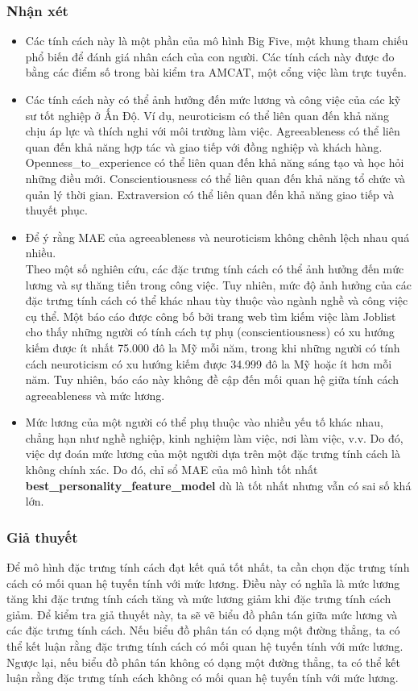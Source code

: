 \documentclass[]{article}
\begin{document}
\subsubsection{Nhận xét}
\begin{itemize}
  \item Các tính cách này là một phần của mô hình Big Five, một khung tham chiếu phổ biến để đánh giá nhân cách của con người. Các tính cách này được đo bằng các điểm số trong bài kiểm tra AMCAT, một cổng việc làm trực tuyến. \cite{kaggleEngineeringGraduate}
  \item Các tính cách này có thể ảnh hưởng đến mức lương và công việc của các kỹ sư tốt nghiệp ở Ấn Độ. Ví dụ, neuroticism có thể liên quan đến khả năng chịu áp lực và thích nghi với môi trường làm việc. Agreeableness có thể liên quan đến khả năng hợp tác và giao tiếp với đồng nghiệp và khách hàng. Openness\_to\_experience có thể liên quan đến khả năng sáng tạo và học hỏi những điều mới. Conscientiousness có thể liên quan đến khả năng tổ chức và quản lý thời gian. Extraversion có thể liên quan đến khả năng giao tiếp và thuyết phục.
  \item Để ý rằng MAE của agreeableness và neuroticism không chênh lệch nhau quá nhiều. \\
  Theo một số nghiên cứu, các đặc trưng tính cách có thể ảnh hưởng đến mức lương và sự thăng tiến trong công việc. Tuy nhiên, mức độ ảnh hưởng của các đặc trưng tính cách có thể khác nhau tùy thuộc vào ngành nghề và công việc cụ thể. \cite{personalityTraitsPredict}
  Một báo cáo được công bố bởi trang web tìm kiếm việc làm Joblist cho thấy những người có tính cách tự phụ (conscientiousness) có xu hướng kiếm được ít nhất 75.000 đô la Mỹ mỗi năm, trong khi những người có tính cách neuroticism có xu hướng kiếm được 34.999 đô la Mỹ hoặc ít hơn mỗi năm. Tuy nhiên, báo cáo này không đề cập đến mối quan hệ giữa tính cách agreeableness và mức lương. \cite{personalityTraitsPredict2}
  \item Mức lương của một người có thể phụ thuộc vào nhiều yếu tố khác nhau, chẳng hạn như nghề nghiệp, kinh nghiệm làm việc, nơi làm việc, v.v. Do đó, việc dự đoán mức lương của một người dựa trên một đặc trưng tính cách là không chính xác. Do đó, chỉ sổ MAE của mô hình tốt nhất \textbf{best\_personality\_feature\_model} dù là tốt nhất nhưng vẫn có sai số khá lớn.
\end{itemize}

\subsubsection{Giả thuyết}
Để mô hình đặc trưng tính cách đạt kết quả tốt nhất, ta cần chọn đặc trưng tính cách có mối quan hệ tuyến tính với mức lương. Điều này có nghĩa là mức lương tăng khi đặc trưng tính cách tăng và mức lương giảm khi đặc trưng tính cách giảm. Để kiểm tra giả thuyết này, ta sẽ vẽ biểu đồ phân tán giữa mức lương và các đặc trưng tính cách. Nếu biểu đồ phân tán có dạng một đường thẳng, ta có thể kết luận rằng đặc trưng tính cách có mối quan hệ tuyến tính với mức lương. Ngược lại, nếu biểu đồ phân tán không có dạng một đường thẳng, ta có thể kết luận rằng đặc trưng tính cách không có mối quan hệ tuyến tính với mức lương.
\end{document}
